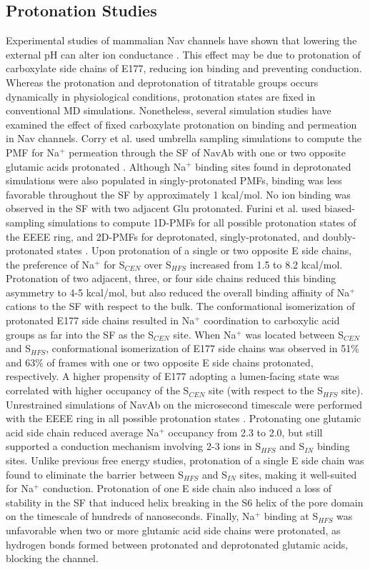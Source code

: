\begin{refsection}
  \subsection{Protonation Studies}
Experimental studies of mammalian Nav channels have shown that lowering the external pH can alter ion conductance \cite{Khan:2006em,Baker:1999tj}.  This effect may be due to protonation of carboxylate side chains of E177, reducing ion binding and preventing conduction. Whereas the protonation and deprotonation of titratable groups occurs dynamically in physiological conditions, protonation states are fixed in conventional MD simulations. Nonetheless, several simulation studies have examined the effect of fixed carboxylate protonation on binding and permeation in Nav channels.
Corry et al. used umbrella sampling simulations to compute the PMF for Na$^{+}$ permeation through the SF of NavAb with one or two opposite glutamic acids protonated \cite{Corry:2012ge}.  Although Na$^{+}$ binding sites found in deprotonated simulations were also populated in singly-protonated PMFs, binding was less favorable throughout the SF by approximately 1 kcal/mol.  No ion binding was observed in the SF with two adjacent Glu protonated.
Furini et al. used biased-sampling simulations to compute 1D-PMFs for all possible protonation states of the EEEE ring, and 2D-PMFs for deprotonated, singly-protonated, and doubly-protonated states \cite{Furini:2014gv}.  Upon protonation of a single or two opposite E side chains, the preference of Na$^{+}$ for S$_{CEN}$ over S$_{HFS}$ increased from 1.5 to 8.2 kcal/mol.  Protonation of two adjacent, three, or four side chains reduced this binding asymmetry to 4-5 kcal/mol, but also reduced the overall binding affinity of Na$^{+}$ cations to the SF with respect to the bulk.  The conformational isomerization of protonated E177 side chains resulted in Na$^{+}$ coordination to carboxylic acid groups as far into the SF as the S$_{CEN}$ site. When Na$^{+}$ was located between S$_{CEN}$ and S$_{HFS}$, conformational isomerization of E177 side chains was observed in 51\% and 63\% of frames with one or two opposite E side chains protonated, respectively.  A higher propensity of E177 adopting a lumen-facing state was correlated with higher occupancy of the S$_{CEN}$ site (with respect to the S$_{HFS}$ site).
	Unrestrained simulations of NavAb on the microsecond timescale were performed with the EEEE ring in all possible protonation states \cite{Boiteux:2014ut}.  Protonating one glutamic acid side chain reduced average Na$^{+}$ occupancy from 2.3 to 2.0, but still supported a conduction mechanism involving  2-3 ions in S$_{HFS}$ and S$_{IN}$ binding sites.  Unlike previous free energy studies, protonation of a single E side chain was found to eliminate the barrier between S$_{HFS}$ and S$_{IN}$ sites, making it well-suited for Na$^{+}$ conduction.  Protonation of one E side chain also induced a loss of stability in the SF that induced helix breaking in the S6 helix of the pore domain on the timescale of hundreds of nanoseconds.  Finally, Na$^{+}$ binding at S$_{HFS}$ was unfavorable when two or more glutamic acid side chains were protonated, as hydrogen bonds formed between protonated and deprotonated glutamic acids, blocking the channel.


\end{refsection}
